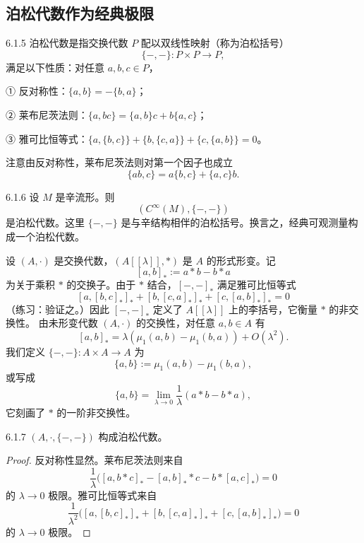 \subsection{泊松代数作为经典极限}

\begin{definition}{6.1.5}
  泊松代数是指交换代数 $P$ 配以双线性映射（称为泊松括号）
  \[
  \{-,-\}:P\times P\longrightarrow P,
  \]
  满足以下性质：对任意 $a,b,c\in P$，

  ① 反对称性：$\{a,b\}=-\{b,a\}$；

  ② 莱布尼茨法则：$\{a,bc\}=\{a,b\}c+b\{a,c\}$；

  ③ 雅可比恒等式：$\{a,\{b,c\}\}+\{b,\{c,a\}\}+\{c,\{a,b\}\}=0$。

  注意由反对称性，莱布尼茨法则对第一个因子也成立
  \[
  \{ab,c\}=a\{b,c\}+\{a,c\}b.
  \]
\end{definition}

\begin{example}{6.1.6}
  设 $M$ 是辛流形。则
  \[
  (C^\infty(M),\{-,-\})
  \]
  是泊松代数。这里 $\{-,-\}$ 是与辛结构相伴的泊松括号。换言之，经典可观测量构成一个泊松代数。
\end{example}

设 $(A,\cdot)$ 是交换代数，$(A[[\lambda]],*)$ 是 $A$ 的形式形变。记
\[
[a,b]_*:=a*b-b*a
\]
为关于乘积 $*$ 的交换子。由于 $*$ 结合，$[-, -]_*$ 满足雅可比恒等式
\[
[a,[b,c]_*]_*+[b,[c,a]_*]_*+[c,[a,b]_*]_*=0
\]
（练习：验证之。）因此 $[-, -]_*$ 定义了 $A[[\lambda]]$ 上的李括号，它衡量 $*$ 的非交换性。
由未形变代数 $(A,\cdot)$ 的交换性，对任意 $a,b\in A$ 有
\[
[a,b]_*=\lambda(\mu_1(a,b)-\mu_1(b,a))+O(\lambda^2).
\]
我们定义 $\{-,-\}:A\times A\longrightarrow A$ 为
\[
\{a,b\}:=\mu_1(a,b)-\mu_1(b,a),
\]
或写成
\[
\{a,b\}=\lim_{\lambda\to0}\frac{1}{\lambda}(a*b-b*a),
\]
它刻画了 $*$ 的一阶非交换性。

\begin{proposition}{6.1.7}
  $(A,\cdot,\{-,-\})$ 构成泊松代数。
\end{proposition}

\begin{proof}
  反对称性显然。莱布尼茨法则来自
  \[
  \frac{1}{\lambda}\big([a,b*c]_*-[a,b]_**c-b*[a,c]_*\big)=0
  \]
  的 $\lambda\to0$ 极限。雅可比恒等式来自
  \[
  \frac{1}{\lambda^2}\big([a,[b,c]_*]_*+[b,[c,a]_*]_*+[c,[a,b]_*]_*\big)=0
  \]
  的 $\lambda\to0$ 极限。
\end{proof}

